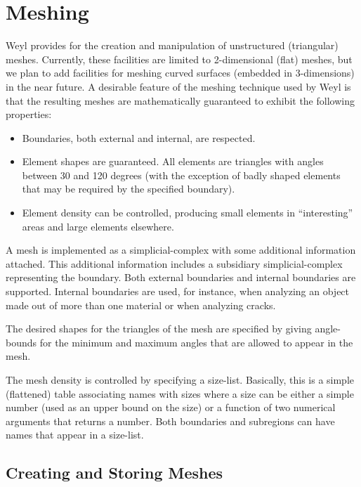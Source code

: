 
\chapter{Meshing}
\label{Mesh:Chap}

Weyl provides for the creation and manipulation of unstructured
(triangular) meshes.  Currently, these facilities are limited to
2-dimensional (flat) meshes, but we plan to add facilities for meshing
curved surfaces (embedded in 3-dimensions) in the near future.  A
desirable feature of the meshing technique used by Weyl is that the
resulting meshes are mathematically guaranteed to exhibit the
following properties: 
\begin{itemize}

\item 
Boundaries, both external and internal, are respected.  

\item 
Element shapes are guaranteed.  All elements are triangles with angles
between 30 and 120 degrees (with the exception of badly shaped
elements that may be required by the specified boundary).

\item
Element density can be controlled, producing small elements in
``interesting'' areas and large elements elsewhere.
\end{itemize}

A mesh is implemented as a simplicial-complex with some additional
information attached.  This additional information includes a
subsidiary simplicial-complex representing the boundary.  Both
external boundaries and internal boundaries are supported.  Internal
boundaries are used, for instance, when analyzing an object made out
of more than one material or when analyzing cracks.

The desired shapes for the triangles of the mesh are specified by
giving angle-bounds for the minimum and maximum angles that are
allowed to appear in the mesh.

The mesh density is controlled by specifying a size-list.  Basically,
this is a simple (flattened) table associating names with sizes where
a size can be either a simple number (used as an upper bound on the
size) or a function of two numerical arguments that returns a number.
Both boundaries and subregions can have names that appear in a
size-list.

\section{Creating and Storing Meshes}
\label{CreateMesh:Sec}

